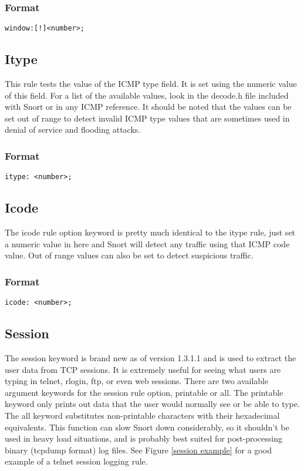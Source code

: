 \documentclass[english]{report}
\begin{document}
\subsubsection{Format}

\begin{verbatim}
window:[!]<number>;
\end{verbatim}

\subsection{Itype}

This rule tests the value of the ICMP type field. It is set using
the numeric value of this field. For a list of the available values,
look in the decode.h file included with Snort or in any ICMP reference.
It should be noted that the values can be set out of range to detect
invalid ICMP type values that are sometimes used in denial of service
and flooding attacks.


\subsubsection{Format}

\begin{verbatim}
itype: <number>;
\end{verbatim}

\subsection{Icode}

The icode rule option keyword is pretty much identical to the itype
rule, just set a numeric value in here and Snort will detect any traffic
using that ICMP code value. Out of range values can also be set to
detect suspicious traffic.


\subsubsection{Format}

\begin{verbatim}
icode: <number>;
\end{verbatim}

\subsection{Session}

The session keyword is brand new as of version 1.3.1.1 and is used
to extract the user data from TCP sessions. It is extremely useful
for seeing what users are typing in telnet, rlogin, ftp, or even web
sessions. There are two available argument keywords for the session
rule option, printable or all. The printable keyword only prints out
data that the user would normally see or be able to type. The all
keyword substitutes non-printable characters with their hexadecimal
equivalents. This function can slow Snort down considerably, so it
shouldn't be used in heavy load situations, and is probably best suited
for post-processing binary (tcpdump format) log files. See Figure
\ref{session example} for a good example of a telnet session logging
rule.
\end{document}
